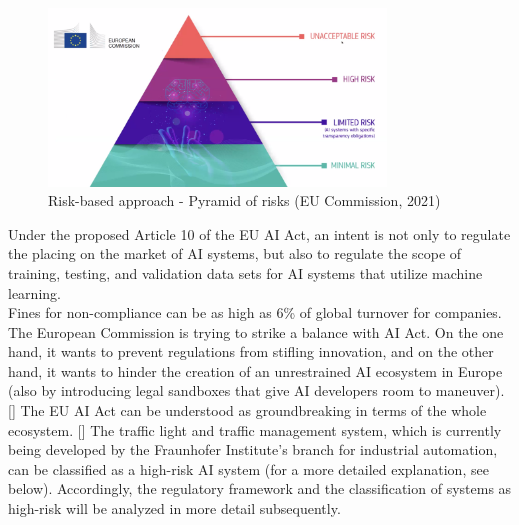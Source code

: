     \begin{figure}[h]
        \centering
        \includegraphics[width=0.8\textwidth]{paper-template/figs/risk_levels.png}
        \caption{Risk-based approach - Pyramid of risks (EU Commission, 2021) }
        \label{fig:my_label}
    \end{figure}
    Under the proposed Article 10 of the EU AI Act, an intent is not only to regulate the placing on the market of AI systems, but also to regulate the scope of training, testing, and validation data sets for AI systems that utilize machine learning.\\
    Fines for non-compliance can be as high as 6\% of global turnover for companies. The European Commission is trying to strike a balance with AI Act. On the one hand, it wants to prevent regulations from stifling innovation, and on the other hand, it wants to hinder the creation of an unrestrained AI ecosystem in Europe (also by introducing legal sandboxes that give AI developers room to maneuver). [\citet{fink2021eu}] The EU AI Act can be understood as groundbreaking in terms of the whole ecosystem. [\citet{kop2021eu}]\newline\newline
    The traffic light and traffic management system, which is currently being developed by the Fraunhofer Institute's branch for industrial automation, can be classified as a high-risk AI system (for a more detailed explanation, see below). Accordingly, the regulatory framework and the classification of systems as high-risk will be analyzed in more detail subsequently.
